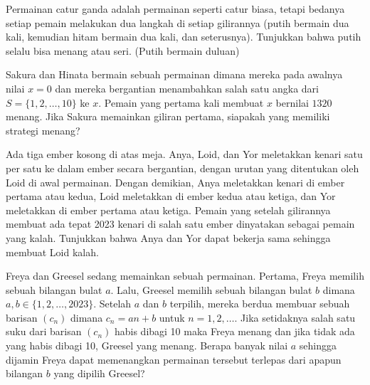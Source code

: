 \documentclass[11pt]{scrartcl}
\begin{document}
\begin{soaljawab}
Permainan catur ganda adalah permainan seperti catur biasa, tetapi bedanya setiap pemain melakukan dua langkah di setiap gilirannya (putih bermain dua kali, kemudian hitam bermain dua kali, dan seterusnya). Tunjukkan bahwa putih selalu bisa menang atau seri. (Putih bermain duluan)
\end{soaljawab}

\begin{soaljawab}
Sakura dan Hinata bermain sebuah permainan dimana mereka pada awalnya nilai $x=0$ dan mereka bergantian menambahkan salah satu angka dari $S=\{1,2,\dots,10\}$ ke $x$. Pemain yang pertama kali membuat $x$ bernilai $1320$ menang. Jika Sakura memainkan giliran pertama, siapakah yang memiliki strategi menang?
\end{soaljawab}

\begin{soaljawab}
Ada tiga ember kosong di atas meja. Anya, Loid, dan Yor meletakkan kenari satu per satu ke dalam ember secara bergantian, dengan urutan yang ditentukan oleh Loid di awal permainan. Dengan demikian, Anya meletakkan kenari di ember pertama atau kedua, Loid meletakkan di ember kedua atau ketiga, dan Yor meletakkan di ember pertama atau ketiga. Pemain yang setelah gilirannya membuat ada tepat 2023 kenari di salah satu ember dinyatakan sebagai pemain yang kalah. Tunjukkan bahwa Anya dan Yor dapat bekerja sama sehingga membuat Loid kalah.
\end{soaljawab}

\begin{soaljawab}
    Freya dan Greesel sedang memainkan sebuah permainan. Pertama, Freya memilih sebuah bilangan bulat $a$. Lalu, Greesel memilih sebuah bilangan bulat $b$ dimana $a,b \in \{1,2,\dots,2023\}$. Setelah $a$ dan $b$ terpilih, mereka berdua membuar sebuah barisan $(c_n)$ dimana $c_n = an + b$ untuk $n = 1,2,\dots$. Jika setidaknya salah satu suku dari barisan $(c_n)$ habis dibagi 10 maka Freya menang dan jika tidak ada yang habis dibagi 10, Greesel yang menang. Berapa banyak nilai $a$ sehingga dijamin Freya dapat memenangkan permainan tersebut terlepas dari apapun bilangan $b$ yang dipilih Greesel?
\end{soaljawab}
\end{document}
